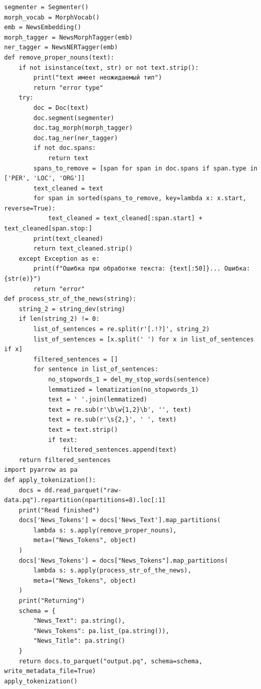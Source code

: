 \documentclass[coursework]{SCWorks}
\begin{document}
\begin{verbatim}
segmenter = Segmenter()
morph_vocab = MorphVocab()
emb = NewsEmbedding()
morph_tagger = NewsMorphTagger(emb)
ner_tagger = NewsNERTagger(emb)
def remove_proper_nouns(text):
    if not isinstance(text, str) or not text.strip():
        print("text имеет неожидаемый тип")
        return "error type"
    try:
        doc = Doc(text)
        doc.segment(segmenter)
        doc.tag_morph(morph_tagger)
        doc.tag_ner(ner_tagger)
        if not doc.spans:
            return text
        spans_to_remove = [span for span in doc.spans if span.type in ['PER', 'LOC', 'ORG']]
        text_cleaned = text
        for span in sorted(spans_to_remove, key=lambda x: x.start, reverse=True):
            text_cleaned = text_cleaned[:span.start] + text_cleaned[span.stop:]
        print(text_cleaned)
        return text_cleaned.strip()
    except Exception as e:
        print(f"Ошибка при обработке текста: {text[:50]}... Ошибка: {str(e)}")
        return "error"
def process_str_of_the_news(string):
    string_2 = string_dev(string)
    if len(string_2) != 0:
        list_of_sentences = re.split(r'[.!?]', string_2)
        list_of_sentences = [x.split(' ') for x in list_of_sentences if x]
        filtered_sentences = []
        for sentence in list_of_sentences:
            no_stopwords_1 = del_my_stop_words(sentence)
            lemmatized = lematization(no_stopwords_1)
            text = ' '.join(lemmatized)
            text = re.sub(r'\b\w{1,2}\b', '', text)
            text = re.sub(r'\s{2,}', ' ', text)
            text = text.strip()
            if text:
                filtered_sentences.append(text)
    return filtered_sentences
import pyarrow as pa
def apply_tokenization():
    docs = dd.read_parquet("raw-data.pq").repartition(npartitions=8).loc[:1]
    print("Read finished")
    docs['News_Tokens'] = docs['News_Text'].map_partitions(
        lambda s: s.apply(remove_proper_nouns),
        meta=("News_Tokens", object)
    )
    docs['News_Tokens'] = docs["News_Tokens"].map_partitions(
        lambda s: s.apply(process_str_of_the_news),
        meta=("News_Tokens", object)
    )
    print("Returning")
    schema = {
        "News_Text": pa.string(),
        "News_Tokens": pa.list_(pa.string()),
        "News_Title": pa.string()
    }
    return docs.to_parquet("output.pq", schema=schema, write_metadata_file=True)
apply_tokenization()
\end{verbatim}
\end{document}
